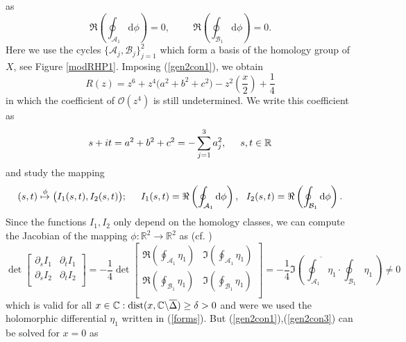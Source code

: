 \documentclass[10pt,oneside,reqno]{amsart}
\numberwithin{equation}{section}
\renewcommand{\d}{{\mathrm d}}
\def\eqref#1{(\ref{#1})}
\begin{document}
as
\begin{equation}\label{gen2con3}
  \Re\left(\oint_{\mathcal{A}_1}\d\phi\right)=0,\hspace{1cm}\Re\left(\oint_{\mathcal{B}_1}\d\phi\right)=0.
\end{equation}
Here we use the cycles $\{\mathcal{A}_j,\mathcal{B}_j\}_{j=1}^2$ which form a basis of the homology group of $X$, see Figure \ref{modRHP1}. Imposing \eqref{gen2con1}, we obtain
\begin{equation}
 R(z)=z^6+z^4\big(a^2+b^2+c^2\big)-z^2\left(\frac{x}{2}\right)+\frac{1}{4}
 \label{R(z)}
\end{equation}
in which the coefficient of $\mathcal{O}(z^4)$ is still undetermined. We write this coefficient as
\begin{equation*}
 s+it = a^2+b^2+c^2=-\sum_{j=1}^3a_j^2,\hspace{0.5cm}s,t\in\mathbb{R}
\end{equation*}
and study the mapping
\begin{equation*}
 (s,t)\stackrel{\phi}{\mapsto}\big(I_1(s,t),I_2(s,t)\big);\hspace{0.5cm}I_1(s,t)=\Re\left(\oint_{\mathcal{A}_1}\d\phi\right),\
 \ I_2(s,t)=\Re\left(\oint_{\mathcal{B}_1}\d\phi\right).
\end{equation*}
Since the functions $I_1,I_2$ only depend on the homology classes, we can compute the Jacobian of the mapping $\phi:\mathbb{R}^2\rightarrow\mathbb{R}^2$ as (cf. \cite{FK})
\begin{equation}\label{Jac}
  \det\begin{bmatrix}
       \partial_s I_1 &\partial_t I_1\\
\partial_s I_2 &\partial_t I_2\\
      \end{bmatrix}=-\frac{1}{4}\det\begin{bmatrix}
\Re\left(\oint_{\mathcal{A}_1}\eta_1\right) & \Im\left(\oint_{\mathcal{A}_1}\eta_1\right)\\
\Re\left(\oint_{\mathcal{B}_1}\eta_1\right) & \Im\left(\oint_{\mathcal{B}_1}\eta_1\right)\\
\end{bmatrix}=-\frac{1}{4}\Im\left(\,\overline{\oint_{\mathcal{A}_1}\eta_1}\cdot\oint_{\mathcal{B}_1}\eta_1\,\right)\neq 0
\end{equation}
which is valid for all $x\in\mathbb{C}:\textnormal{dist}(x,\mathbb{C}\backslash\overline{\Delta})\geq\delta>0$ and were we used the holomorphic differential 
$\eta_1$ written in \eqref{forms}. But \eqref{gen2con1},\eqref{gen2con3} can be solved for $x=0$ as
\end{document}
